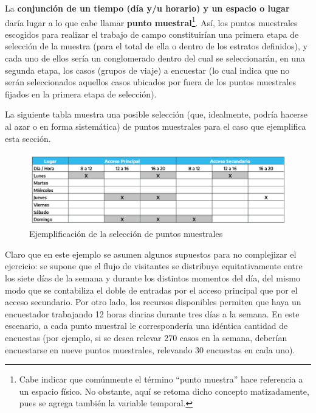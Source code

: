 \documentclass[
]{book}
\begin{document}
La \textbf{conjunción de un tiempo (día y/u horario) y un espacio o lugar} daría lugar a lo que cabe llamar \textbf{punto muestral}\footnote{Cabe indicar que comúnmente el término ``punto muestra'' hace referencia a un espacio físico. No obstante, aquí se retoma dicho concepto matizadamente, pues se agrega también la variable temporal.}. Así, los puntos muestrales escogidos para realizar el trabajo de campo constituirían una primera etapa de selección de la muestra (para el total de ella o dentro de los estratos definidos), y cada uno de ellos sería un conglomerado dentro del cual se seleccionarán, en una segunda etapa, los casos (grupos de viaje) a encuestar (lo cual indica que no serán seleccionados aquellos casos ubicados por fuera de los puntos muestrales fijados en la primera etapa de selección).

La siguiente tabla muestra una posible selección (que, idealmente, podría hacerse al azar o en forma sistemática) de puntos muestrales para el caso que ejemplifica esta sección.

\begin{figure}

{\centering \includegraphics[width=1\linewidth]{imagenes/tabla_4} 

}

\caption{Ejemplificación de la selección de puntos muestrales}\label{fig:Muestraposible}
\end{figure}

Claro que en este ejemplo se asumen algunos supuestos para no complejizar el ejercicio: se supone que el flujo de visitantes se distribuye equitativamente entre los siete días de la semana y durante los distintos momentos del día, del mismo modo que se contabiliza el doble de entradas por el acceso principal que por el acceso secundario. Por otro lado, los recursos disponibles permiten que haya un encuestador trabajando 12 horas diarias durante tres días a la semana. En este escenario, a cada punto muestral le correspondería una idéntica cantidad de encuestas (por ejemplo, si se desea relevar 270 casos en la semana, deberían encuestarse en nueve puntos muestrales, relevando 30 encuestas en cada uno).
\end{document}
